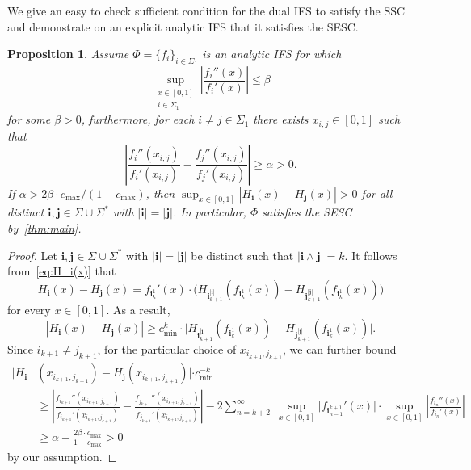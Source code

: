 \documentclass[12pt,]{article}
\def\cref#1{\ref{#1}}%
\newtheorem{proposition}[theorem]{Proposition}
\theoremstyle{definition}
\theoremstyle{remark}
\newcommand{\0}{\mathbf{0}}
\newcommand{\bi}{\mathbf{i}}
\newcommand{\bj}{\mathbf{j}}
\begin{document}
{We give an easy to check sufficient condition for the dual IFS to satisfy the SSC and demonstrate on
an explicit analytic IFS that it satisfies the SESC. 

\begin{proposition}\label{prop:example}
Assume $\Phi=\{f_i\}_{i\in\Sigma_1}$ is an analytic IFS for which
\begin{equation*}
\sup_{\substack{x\in[0,1] \\ i\in\Sigma_1}} \left| \frac{f_i''(x)}{f_i'(x)} \right| \leq \beta
\end{equation*}
for some $\beta>0$, furthermore, for each $i\neq j\in\Sigma_1$ there exists $x_{i,j}\in[0,1]$ such that
\begin{equation*}
\left| \frac{f_i''(x_{i,j})}{f_i'(x_{i,j})} - \frac{f_j''(x_{i,j})}{f_j'(x_{i,j})} \right| \geq \alpha >0. 
\end{equation*}
If $\alpha > 2\beta\cdot c_{\max}/(1-c_{\max})$, then 
$
\sup_{x\in[0,1]} |H_{\bi}(x) - H_{\bj}(x)| > 0 
$
for all distinct $\bi,\bj \in\Sigma\cup\Sigma^*$ with $|\bi|=|\bj|$. In particular, $\Phi$ satisfies
the SESC by~\cref{thm:main}.
\end{proposition}

\begin{proof}
Let $\bi,\bj \in\Sigma\cup\Sigma^*$ with $|\bi|=|\bj|$ be distinct such that $|\bi\wedge \bj|=k$. It
follows from~\cref{eq:H_i(x)} that
\begin{equation*}
H_{\bi}(x)-H_{\bj}(x) = f_{\bi_k^1}'(x)\cdot \big( H_{\bi_{k+1}^{|\bi|}}(f_{\bi_k^1}(x)) -
H_{\bj_{k+1}^{|\bj|}}(f_{\bi_k^1}(x)) \big)
\end{equation*}
for every $x\in[0,1]$. As a result,
\begin{equation*}
|H_{\bi}(x)-H_{\bj}(x)| \geq c_{\min}^k\cdot \big| H_{\bi_{k+1}^{|\bi|}}(f_{\bi_k^1}(x)) -
H_{\bj_{k+1}^{|\bj|}}(f_{\bi_k^1}(x)) \big|.
\end{equation*}
Since $i_{k+1}\neq j_{k+1}$, for the particular choice of $x_{i_{k+1},j_{k+1}}$, we can further bound 
\begin{align*}
|H_{\bi}&(x_{i_{k+1},j_{k+1}}) - H_{\bj}(x_{i_{k+1},j_{k+1}})|\cdot c_{\min}^{-k} \\
&\geq \left| \frac{f_{i_{k+1}}''(x_{i_{k+1},j_{k+1}})}{f_{i_{k+1}}'(x_{i_{k+1},j_{k+1}})} -
\frac{f_{j_{k+1}}''(x_{i_{k+1},j_{k+1}})}{f_{j_{k+1}}'(x_{i_{k+1},j_{k+1}})} \right| - 2
\sum_{n=k+2}^{\infty}\; \sup_{x\in[0,1]} \big| f_{\bi_{n-1}^{k+1}}'(x) \big| \cdot \sup_{x\in[0,1]}
\left| \frac{f_{i_n}''(x)}{f_{i_n}'(x)} \right| \\
&\geq \alpha -  \frac{2\beta\cdot c_{\max}}{1-c_{\max}} >0
\end{align*}
by our assumption.
\end{proof}

}
\end{document}
